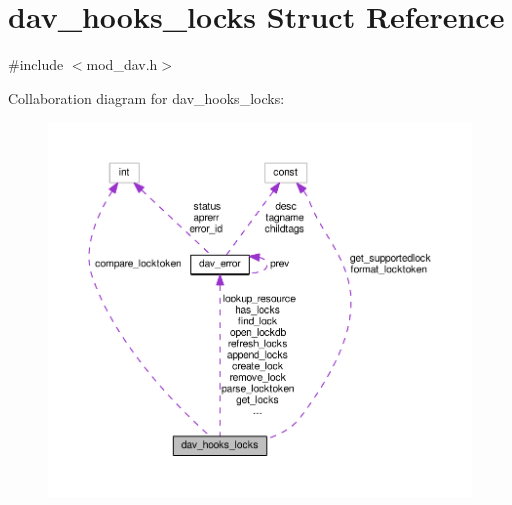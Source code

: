 \hypertarget{structdav__hooks__locks}{}\section{dav\+\_\+hooks\+\_\+locks Struct Reference}
\label{structdav__hooks__locks}


{\ttfamily \#include $<$mod\+\_\+dav.\+h$>$}



Collaboration diagram for dav\+\_\+hooks\+\_\+locks\+:
\nopagebreak
\begin{figure}[H]
\begin{center}
\leavevmode
\includegraphics[width=350pt]{structdav__hooks__locks__coll__graph}
\end{center}
\end{figure}
